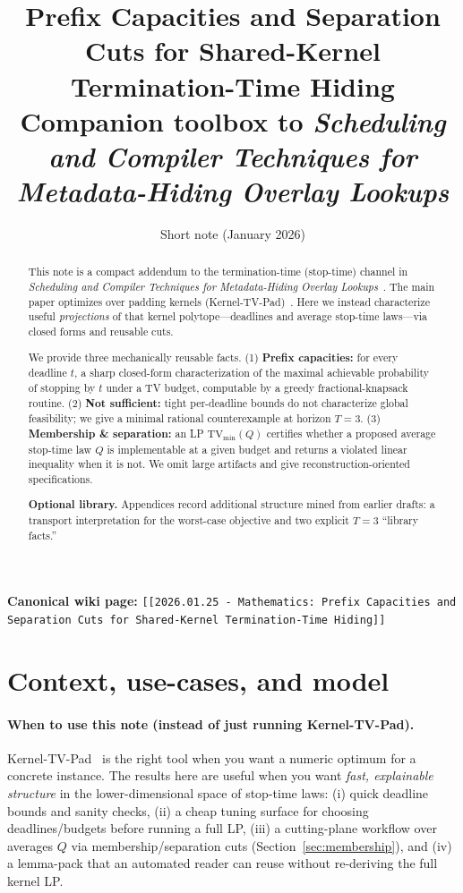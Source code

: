\documentclass[11pt]{article}
\title{Prefix Capacities and Separation Cuts for Shared-Kernel Termination-Time Hiding\\[2pt]
\large Companion toolbox to \emph{Scheduling and Compiler Techniques for Metadata-Hiding Overlay Lookups}}
\author{}
\date{Short note (January 2026)}
\newcommand{\TV}{\mathrm{TV}}
\begin{document}
\maketitle

\noindent\textbf{Canonical wiki page:} \texttt{[[2026.01.25 - Mathematics: Prefix Capacities and Separation Cuts for Shared-Kernel Termination-Time Hiding]]}\\


\begin{abstract}
This note is a compact addendum to the termination-time (stop-time) channel in
\emph{Scheduling and Compiler Techniques for Metadata-Hiding Overlay Lookups}~\cite{schedcompiler}.
The main paper optimizes over padding kernels (Kernel-TV-Pad)~\cite{schedcompiler}.
Here we instead characterize useful \emph{projections} of that kernel polytope---deadlines and average stop-time laws---via closed forms and reusable cuts.

We provide three mechanically reusable facts.
(1) \textbf{Prefix capacities:} for every deadline $t$, a sharp closed-form characterization of the maximal achievable probability of stopping by $t$
under a TV budget, computable by a greedy fractional-knapsack routine.
(2) \textbf{Not sufficient:} tight per-deadline bounds do not characterize global feasibility; we give a minimal rational counterexample at horizon $T=3$.
(3) \textbf{Membership \& separation:} an LP $\TV_{\min}(Q)$ certifies whether a proposed average stop-time law $Q$ is implementable at a given budget and returns a violated linear inequality when it is not.
We omit large artifacts and give reconstruction-oriented specifications.

\smallskip
\noindent\textbf{Optional library.} Appendices record additional structure mined from earlier drafts: a transport interpretation for the worst-case objective and two explicit $T=3$ ``library facts.''
\end{abstract}

\section{Context, use-cases, and model}\label{sec:model}

\paragraph{When to use this note (instead of just running Kernel-TV-Pad).}
Kernel-TV-Pad~\cite{schedcompiler} is the right tool when you want a numeric optimum for a concrete instance.
The results here are useful when you want \emph{fast, explainable structure} in the lower-dimensional space of stop-time laws:
(i) quick deadline bounds and sanity checks,
(ii) a cheap tuning surface for choosing deadlines/budgets before running a full LP,
(iii) a cutting-plane workflow over averages $Q$ via membership/separation cuts (Section~\ref{sec:membership}),
and (iv) a lemma-pack that an automated reader can reuse without re-deriving the full kernel LP.
\end{document}
